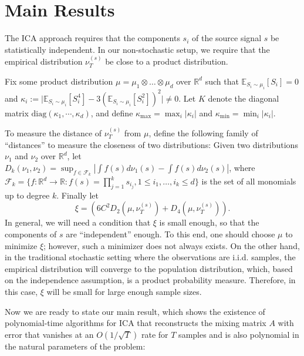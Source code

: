 \documentclass[jmlr]{article}
\newcommand{\E}{\mathbb{E}}
\newcommand{\real}{\mathbb{R}}
\newcommand{\R}{\real}
\newcommand{\iid}{i.i.d.\xspace}
\theoremstyle{definition}
\newtheorem{remark}[lemma]{Remark}
\begin{document}
\section{Main Results}
\label{sec:main}

The ICA approach requires that the components $s_i$ of the source signal $s$ be statistically independent. In our non-stochastic setup, we require that the empirical distribution $\nu_T^{(s)}$ be close to a product distribution.

Fix some product distribution $\mu= \mu_1\otimes \ldots \otimes \mu_d$ over $\R^d$ 
such that $\E_{S_i\sim\mu_i}[S_i]=0$ and $\kappa_i := \vert \E_{S_i\sim \mu_i}[S_i^4] - 3\left(\E_{S_i\sim \mu_i}[S_i^2]\right)^2 \vert \neq 0$. Let
$K$ denote the diagonal matrix $\text{diag}(\kappa_1,\cdots,\kappa_d)$, and define $\kappa_{\max}=\max_{i} |\kappa_i|$ and $\kappa_{\min}=\min_{i} |\kappa_i|$.

To measure the distance of $\nu_T^{(s)}$ from $\mu$, define the following family of ``distances'' to measure the closeness of two distributions: Given two distributions $\nu_1$ and $\nu_2$ over $\R^d$, let $D_k(\nu_1,\nu_2) = \sup_{f\in\mathcal{F}_k} |\int f(s)d\nu_1(s) - \int f(s)d\nu_2(s)|$, where $\mathcal{F}_k=\{f:\R^d \to \R : f(s)=\prod_{j=1}^k s_{i_j}, 1 \le i_1,\ldots,i_k \le d\}$ is the set of all monomials up to degree $k$. Finally let
\begin{equation}
\label{eq:xi}
\xi = \left( 6C^2D_2(\mu, \nu_T^{(s)}) + D_4(\mu, \nu_T^{(s)})\right).
\end{equation}
In general, we will need a condition that $\xi$ is small enough, so that the components of $s$ are ``independent'' enough. To this end, one should choose
$\mu$ to minimize $\xi$; however, such a minimizer does not always exists.
On the other hand, in the traditional stochastic setting where the observations are \iid samples, the empirical distribution will converge to the population distribution, which, based on the independence assumption, is a product probability measure. 
Therefore, in this case, $\xi$ will be small for large enough sample sizes. 

Now we are ready to state our main result, which shows the existence of polynomial-time algorithms for ICA that reconstructs the mixing matrix $A$ 
with error that vanishes at an $O(1/\sqrt{T})$ rate for $T$ samples and is also polynomial in the natural parameters of the problem:
\end{document}
